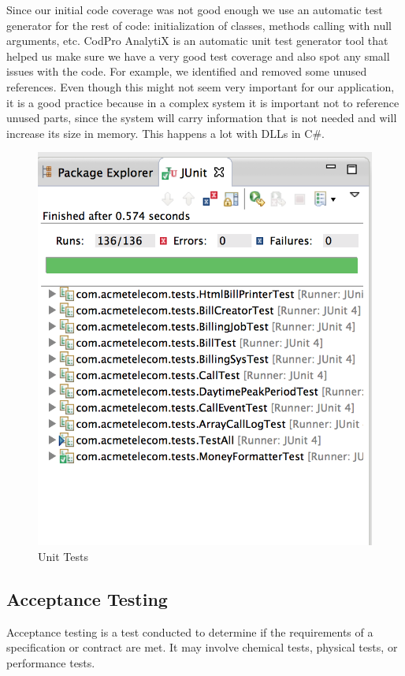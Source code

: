 \documentclass[11pt,twocolumn]{article} %
\begin{document}
Since our initial code coverage was not good enough we use an automatic test generator for the rest of code: initialization of classes, methods calling with null arguments, etc. 
CodPro AnalytiX\cite{codePro}  is an automatic unit test generator tool that helped us make sure we have a very good test coverage and also spot any small issues with the code. 
For example, we identified and removed some unused references. Even though this might not seem very important for our application, it is a good practice because in a 
complex system it is important not to reference unused parts, since the system will carry information that is not needed and will increase its size in memory. This happens a lot with DLLs in C\#. 
\begin{figure}[!ht]
\centering
\includegraphics[scale=0.40]{cod_pro_analytix.png}
\caption{Unit Tests}
\end{figure}

\subsection{Acceptance Testing}
Acceptance testing is a test conducted to determine if the requirements of a specification or contract are met. 
It may involve chemical tests, physical tests, or performance tests.
\end{document}
